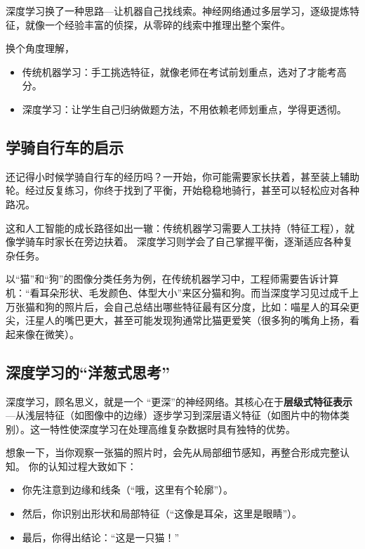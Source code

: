 深度学习换了一种思路---让机器自己找线索。神经网络通过多层学习，逐级提炼特征，就像一个经验丰富的侦探，从零碎的线索中推理出整个案件。

换个角度理解，
\begin{itemize}
    \item 传统机器学习：手工挑选特征，就像老师在考试前划重点，选对了才能考高分。
    \item 深度学习：让学生自己归纳做题方法，不用依赖老师划重点，学得更透彻。
\end{itemize}

\subsection{学骑自行车的启示}
还记得小时候学骑自行车的经历吗？一开始，你可能需要家长扶着，甚至装上辅助轮。经过反复练习，你终于找到了平衡，开始稳稳地骑行，甚至可以轻松应对各种路况。

这和人工智能的成长路径如出一辙：传统机器学习需要人工扶持（特征工程），就像学骑车时家长在旁边扶着。
深度学习则学会了自己掌握平衡，逐渐适应各种复杂任务。

以“猫”和“狗”的图像分类任务为例，在传统机器学习中，工程师需要告诉计算机：“看耳朵形状、毛发颜色、体型大小”来区分猫和狗。而当深度学习见过成千上万张猫和狗的照片后，会自己总结出哪些特征最有区分度，比如：喵星人的耳朵更尖，汪星人的嘴巴更大，甚至可能发现狗通常比猫更爱笑（很多狗的嘴角上扬，看起来像在微笑）。


\subsection{ 深度学习的“洋葱式思考”}
深度学习，顾名思义，就是一个 “更深”的神经网络。其核心在于\textbf{层级式特征表示}---从浅层特征（如图像中的边缘）逐步学习到深层语义特征（如图片中的物体类别）。这一特性使深度学习在处理高维复杂数据时具有独特的优势。

想象一下，当你观察一张猫的照片时，会先从局部细节感知，再整合形成完整认知。
你的认知过程大致如下：
\begin{itemize}
   \item 你先注意到边缘和线条（“哦，这里有个轮廓”）。
  \item 然后，你识别出形状和局部特征（“这像是耳朵，这里是眼睛”）。  
  \item  最后，你得出结论：“这是一只猫！”
\end{itemize}

